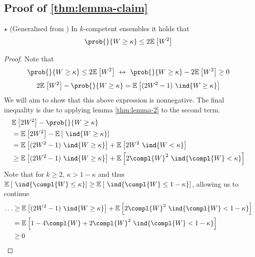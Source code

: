 \documentclass[
	twoside=false, %
]{kaobook}
\begin{document}
\subsection{Proof of \cref{thm:lemma-claim}}
\label{sec:proof-lemma-claim}

\begin{lemma} $\star$ (Generalised from \cite{theisen_WhenAreEnsembles_2023}) In $k$-competent ensembles it holds that
$$
\prob{}{W \geq \kappa} \leq 2 \mathbb{E}_{}\left[ W^2 \right] 
$$
\end{lemma}
\begin{proof}
Note that
$$
\prob{}{W \geq \kappa} \leq 2 \mathbb{E}_{}\left[ W^2 \right] ~\leftrightarrow~ 
\prob{}{W \geq \kappa} - 2 \mathbb{E}_{}\left[ W^2 \right] \geq 0
$$
$$
2\mathbb{E}_{}\left[ W^2 \right] - \prob{}{W \geq \kappa} = 
\mathbb{E}_{}\left[ (2W^2-1)~\ind{W \geq \kappa} \right]
$$
We will aim to show that this above expression is nonnegative.
The  final inequality is due to applying lemma \ref{thm:lemma-2} to the second term.
\begin{align*}
& \mathbb{E}_{}\left[ 2W^2 \right]  - \prob{}{W \geq \kappa}  \\
&= \mathbb{E}_{}\left[ 2W^2 \right]  - \mathbb{E}_{}\left[ ~\ind{W \geq \kappa} \right]  \\
&= \mathbb{E}_{}\left[ (2W^2 - 1) ~\ind{W \geq \kappa} \right]  + \mathbb{E}_{}\left[ 2W^2 ~\ind{W < \kappa} \right] \\
& \geq  \mathbb{E}_{}\left[ (2W^2 - 1) ~\ind{W \geq \kappa} \right]  + \mathbb{E}_{}\left[ 2\compl{W} ^2 ~\ind{\compl{W}  < \kappa} \right] 
\end{align*}
Note that for $k \geq 2$, $\kappa > 1-\kappa$ and thus $\mathbb{E}_{}\left[ ~\ind{\compl{W} \leq \kappa} \right] \geq \mathbb{E}_{}\left[ ~\ind{\compl{W} \leq 1 - \kappa} \right]$, allowing us to continue
\begin{align*}
\dots &\geq 
\mathbb{E}_{}\left[ (2W^2 - 1) ~\ind{W \geq \kappa} \right]  + \mathbb{E}_{}\left[ 2\compl{W} ^2 ~\ind{\compl{W}  < 1-\kappa} \right]  \\
&= \mathbb{E}_{}\left[ 1-4 \compl{W} + 2 \compl{W}^2 ~\ind{\compl{W} < 1-\kappa }  \right]  \\
& \geq 0
\end{align*}
\end{proof}
\end{document}
